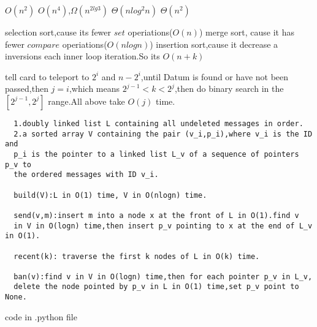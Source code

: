 \documentclass[12pt,twoside]{article}
\begin{document}


\begin{problems}

\problem  %

\begin{problemparts}
\problempart %
$O(n^2)$
\problempart %
$O(n^4)$,$\Omega(n^{2lg3})$
\problempart %
$\Theta(n{log^2}n)$
\problempart %
$\Theta(n^2)$
\end{problemparts}

\newpage
\problem  %

\begin{problemparts}
\problempart %
selection sort,cause its fewer $set$ operiations($O(n)$)
\problempart %
merge sort, cause it has fewer $compare$ operiations($O(nlogn)$)
\problempart %
insertion sort,cause it decrease a inversions each inner loop iteration.So its
$O(n+k)$
\end{problemparts}

\newpage
\problem  %
tell card to teleport to $2^i$ and $n-2^i$,until Datum is found or have not been
passed,then $j=i$,which means $2^{j-1}<k<2^j$,then do binary search in the
$[2^{j-1},2^j]$ range.All above take $O(j)$ time. 
\newpage
\problem  %
\begin{verbatim}
  1.doubly linked list L containing all undeleted messages in order.
  2.a sorted array V containing the pair (v_i,p_i),where v_i is the ID and
  p_i is the pointer to a linked list L_v of a sequence of pointers p_v to
  the ordered messages with ID v_i. 

  build(V):L in O(1) time, V in O(nlogn) time.

  send(v,m):insert m into a node x at the front of L in O(1).find v
  in V in O(logn) time,then insert p_v pointing to x at the end of L_v in O(1).

  recent(k): traverse the first k nodes of L in O(k) time.

  ban(v):find v in V in O(logn) time,then for each pointer p_v in L_v,
  delete the node pointed by p_v in L in O(1) time,set p_v point to None.

\end{verbatim}
\newpage
\problem  %

\begin{problemparts}
\problempart %
\problempart %
\problempart code in .python file
\end{problemparts}

\end{problems}
\end{document}
